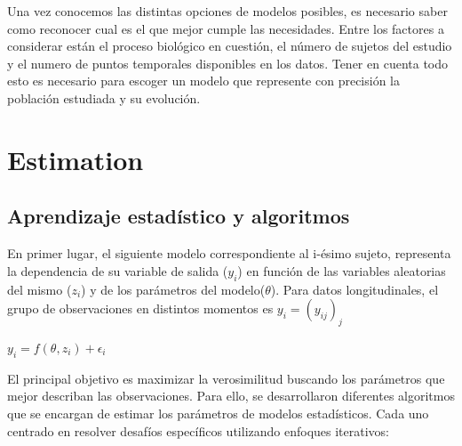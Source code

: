 	Una vez conocemos las distintas opciones de modelos posibles, es necesario saber como reconocer cual es el que mejor cumple las necesidades. Entre los factores a considerar están el proceso biológico en cuestión, el número de sujetos del estudio y el numero de puntos temporales disponibles en los datos. Tener en cuenta todo esto es necesario para escoger un modelo que represente con precisión la población estudiada y su evolución.\\
	
	
	
	
	
	\section{Estimation}
	\subsection{Aprendizaje estadístico y algoritmos}
	En primer lugar, el siguiente modelo correspondiente al i-ésimo sujeto, representa la dependencia de su variable de salida ($y_{i}$) en función de las variables aleatorias del mismo ($z_{i}$) y de los parámetros del modelo($\theta$). Para datos longitudinales, el grupo de observaciones en distintos momentos es $y_{i}=(y_{ij})_{j}$
	\begin{center}
		$y_{i}=f(\theta,z_{i})+\epsilon_{i}$
	\end{center}
	
	El principal objetivo es maximizar la verosimilitud buscando los parámetros que mejor describan las observaciones. Para ello, se desarrollaron diferentes algoritmos que se encargan de estimar los parámetros de modelos estadísticos. Cada uno centrado en resolver desafíos específicos utilizando enfoques iterativos:
	
